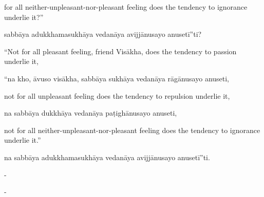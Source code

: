 \begin{samepage}
\begin{leftcolumn*}
for all neither-unpleasant-nor-pleasant feeling does the tendency to ignorance underlie it?”
\end{leftcolumn*}

\begin{rightcolumn}
sabbāya adukkhamasukhāya vedanāya avijjānusayo anusetī”ti?
\end{rightcolumn}
\end{samepage}

\begin{samepage}
\begin{leftcolumn*}
“Not for all pleasant feeling, friend Visākha, does the tendency to passion underlie it,
\end{leftcolumn*}

\begin{rightcolumn}
“na kho, āvuso visākha, sabbāya sukhāya vedanāya rāgānusayo anuseti,
\end{rightcolumn}
\end{samepage}

\begin{samepage}
\begin{leftcolumn*}
not for all unpleasant feeling does the tendency to repulsion underlie it,
\end{leftcolumn*}

\begin{rightcolumn}
na sabbāya dukkhāya vedanāya paṭighānusayo anuseti,
\end{rightcolumn}
\end{samepage}

\begin{samepage}
\begin{leftcolumn*}
not for all neither-unpleasant-nor-pleasant feeling does the tendency to ignorance underlie it.”
\end{leftcolumn*}

\begin{rightcolumn}
na sabbāya adukkhamasukhāya vedanāya avijjānusayo anusetī”ti.
\end{rightcolumn}
\end{samepage}

\begin{samepage}
\begin{leftcolumn*}
-
\end{leftcolumn*}

\begin{rightcolumn}
-
\end{rightcolumn}
\end{samepage}

